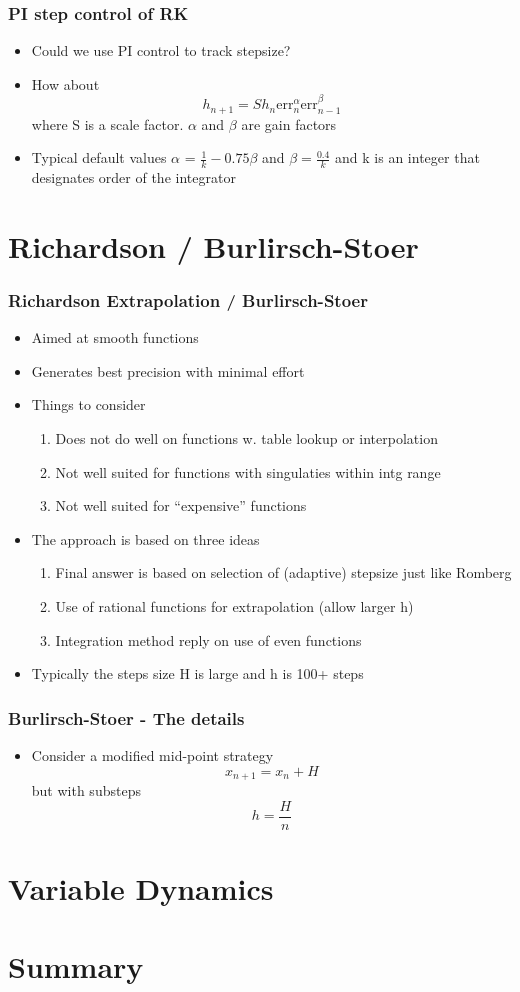 \documentclass[10pt]{beamer}
\begin{document}
\begin{frame}
  \frametitle{PI step control of RK}
  \begin{itemize}
  \item Could we use PI control to track stepsize? \pause
  \item How about
    \[
      h_{n+1} = S h_n \mbox{err}_n^{\alpha} \mbox{err}_{n-1}^{\beta}
    \]
    where S is a scale factor. $\alpha$ and $\beta$ are gain factors
  \item Typical default values $\alpha$ = $\frac{1}{k} - 0.75 \beta$
    and $\beta = \frac{0.4}{k}$ and k is an integer that designates
    order of the integrator
  \end{itemize}
\end{frame}
\section{Richardson / Burlirsch-Stoer}

\begin{frame}
  \frametitle{Richardson Extrapolation / Burlirsch-Stoer}
  \begin{itemize}
  \item Aimed at smooth functions 
  \item Generates best precision with minimal effort
  \item Things to consider
    \begin{enumerate}
    \item Does not do well on functions w. table lookup or interpolation
    \item Not well suited for functions with singulaties within intg range
    \item Not well suited for ``expensive'' functions
    \end{enumerate}
  \item The approach is based on three ideas
    \begin{enumerate}
    \item Final answer is based on selection of (adaptive) stepsize just like Romberg
    \item Use of rational functions for extrapolation (allow larger h)
    \item Integration method reply on use of even functions
    \end{enumerate}
  \item Typically the steps size H is large and h is 100+ steps
  \end{itemize}
\end{frame}

\begin{frame}
  \frametitle{Burlirsch-Stoer - The details}
  \begin{itemize}
  \item Consider a modified mid-point strategy
    \[
      x_{n+1} = x_n + H
    \] but with substeps
    \[
      h = \frac{H}{n}
    \]
  \end{itemize}
\end{frame}

\section{Variable Dynamics}


\section{Summary}
\end{document}
